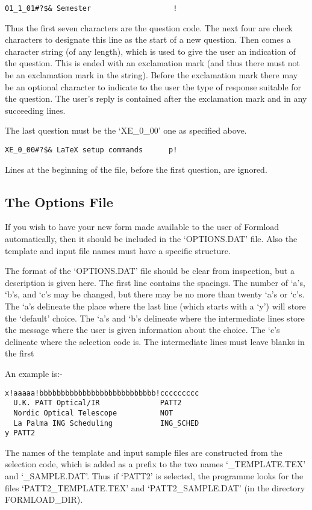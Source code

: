 \begin{verbatim}
01_1_01#?$& Semester                   !
\end{verbatim}

Thus the first seven characters are the question code. The next four are
check characters to designate this line as the start of a new question.
Then comes a character string (of any length), which is used to give the
user an indication of the question. This is ended with an exclamation mark
(and thus there must not be an exclamation mark in the string). Before the
exclamation mark there may be an optional character to indicate to the user
the type of response suitable for the question. The user's reply is
contained after the exclamation mark and in any succeeding lines. 

The last question must be the `XE\_0\_00' one as specified above. 

\begin{verbatim}
XE_0_00#?$& LaTeX setup commands      p!
\end{verbatim}

Lines at the beginning of the file, before the first question, are ignored. 


\subsection{The Options File}

If you wish to have your new form made available to the user of Formload
automatically, then it should be included in the `OPTIONS.DAT' file. Also
the template and input file names must have a specific structure. 

The format of the `OPTIONS.DAT' file should be clear from inspection, but a
description is given here. The first line contains the spacings. The number
of `a's, `b's, and `c's may be changed, but there may be no more than
twenty `a's or `c's. The `a's delineate the place where the last line
(which starts with a `y') will store the `default' choice. The `a's and
`b's delineate where the intermediate lines store the message where the
user is given information about the choice. The `c's delineate where the
selection code is. The intermediate lines must leave blanks in the first 

An example is:-

\begin{verbatim}
x!aaaaa!bbbbbbbbbbbbbbbbbbbbbbbbbbb!ccccccccc
  U.K. PATT Optical/IR              PATT2
  Nordic Optical Telescope          NOT
  La Palma ING Scheduling           ING_SCHED
y PATT2
\end{verbatim}

The names of the template and input sample files are constructed from the
selection code, which is added as a prefix to the two names
`\_TEMPLATE.TEX' and `\_SAMPLE.DAT'. Thus if `PATT2' is selected, the
programme looks for the files `PATT2\_TEMPLATE.TEX' and `PATT2\_SAMPLE.DAT'
(in the directory FORMLOAD\_DIR). 


